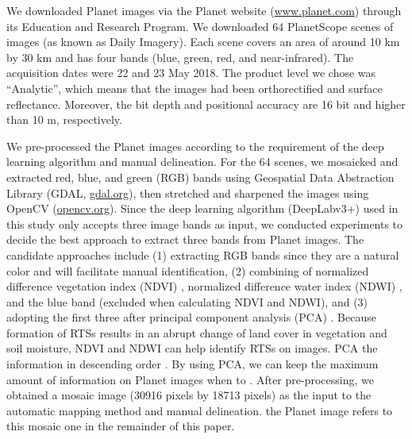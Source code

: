 \documentclass[authoryear,preprint,review,12pt]{elsarticle}
\begin{document}
We downloaded Planet images via the Planet website (\url{www.planet.com}) through its Education and Research Program. We downloaded 64 PlanetScope scenes of images (as known as Daily Imagery). Each scene covers an area of around 10 km by 30 km and has four bands (blue, green, red, and near-infrared). The acquisition dates were  22 and 23 May 2018. The product level we chose was ``Analytic'', which means that the images had been orthorectified and  surface reflectance. Moreover, the bit depth and positional accuracy are 16 bit and higher than 10 m, respectively. %

We pre-processed the Planet images according to the requirement of the deep learning algorithm and manual delineation. For the 64 scenes, we mosaicked and extracted red, blue, and green (RGB) bands using Geospatial Data Abstraction Library (GDAL, \url{gdal.org}), then stretched and sharpened the images using OpenCV (\url{opencv.org}). Since the deep learning algorithm (DeepLabv3+) used in this study only accepts three image bands as input, we conducted experiments to decide the best approach to extract three bands from Planet images. The candidate approaches include (1) extracting RGB bands since they are a natural color and will facilitate manual identification, (2) combining of normalized difference vegetation index (NDVI) \citep{rouse1974monitoring}, normalized difference water index (NDWI) \citep{mcfeeters1996use}, and the blue band (excluded when calculating NDVI and NDWI), and (3) adopting the first three  after  principal component analysis (PCA) . Because formation of RTSs results in an abrupt change of land cover in vegetation and soil moisture,  NDVI and NDWI can help identify RTSs on images. PCA  the information in descending order \citep{wold1987principal}.  By using PCA, we can keep the maximum amount of information on Planet images when  to . 
 After pre-processing, we obtained a mosaic image (30916 pixels by 18713 pixels) as the input to the automatic mapping method and manual delineation.  the Planet image refers to this mosaic one in the remainder of this paper.
\end{document}
